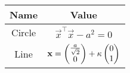 \begin{tabular}{|c|c|}
\hline
\textbf{Name} & \textbf{Value} \\
\hline
Circle & $\vec{x}^\top\vec{x} - a^2 = 0$ \\
\hline
Line & $\mathbf{x} = \begin{pmatrix}\tfrac{a}{\sqrt{2}} \\ 0\end{pmatrix} + \kappa\begin{pmatrix}0 \\ 1\end{pmatrix}$ \\
\hline
\end{tabular}
